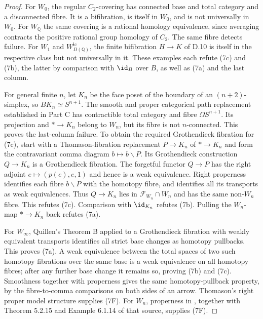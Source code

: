 \begin{proof}
For $W_0$, the regular $C_2$-covering has connected base and total category and a disconnected fibre. It is a bifibration, is itself in $W_0$, and is not universally in $W_0$. For $W_{\mathbb Q}$ the same covering is a rational homology equivalence, since averaging contracts the positive rational group homology of $C_2$. The same fibre detects failure. For $W_1$ and $W_{D(\mathbb Q)}^{\mathrm{lc}}$, the finite bifibration $H\to K$ of D.10 is itself in the respective class but not universally in it. These examples each refute (7c) and (7b), the latter by comparison with $\id_B$ over $B$, as well as (7a) and the last column.

For general finite $n$, let $K_n$ be the face poset of the boundary of an $(n+2)$-simplex, so $BK_n\simeq S^{n+1}$. The smooth and proper categorical path replacement established in Part C has contractible total category and fibre $\Omega S^{n+1}$. Its projection and $*\to K_n$ belong to $W_n$, but its fibre is not $n$-connected. This proves the last-column failure. To obtain the required Grothendieck fibration for (7c), start with a Thomason-fibration replacement $P\to K_n$ of $*\to K_n$ and form the contravariant comma diagram $b\mapsto b\backslash P$. Its Grothendieck construction $Q\to K_n$ is a Grothendieck fibration. The forgetful functor $Q\to P$ has the right adjoint $e\mapsto(p(e),e,1)$ and hence is a weak equivalence. Right properness identifies each fibre $b\backslash P$ with the homotopy fibre, and identifies all its transports as weak equivalences. Thus $Q\to K_n$ lies in $\mathcal F_{W_n}\cap W_n$ and has the same non-$W_n$ fibre. This refutes (7c). Comparison with $\id_{K_n}$ refutes (7b). Pulling the $W_n$-map $*\to K_n$ back refutes (7a).

For $W_\infty$, Quillen's Theorem B applied to a Grothendieck fibration with weakly equivalent transports identifies all strict base changes as homotopy pullbacks. This proves (7a). A weak equivalence between the total spaces of two such homotopy fibrations over the same base is a weak equivalence on all homotopy fibres; after any further base change it remains so, proving (7b) and (7c). Smoothness together with properness gives the same homotopy-pullback property, by the fibre-to-comma comparisons on both sides of an arrow. Thomason's right proper model structure supplies (7F). For $W_n$, properness in \citet[Section 9.2.1]{RCisinski2006}, together with Theorem 5.2.15 and Example 6.1.14 of that source, supplies (7F).


\end{proof}
